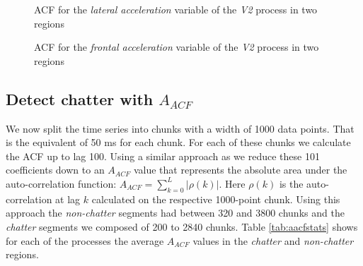 \documentclass[12 pt]{scrartcl}
\begin{document}
\begin{figure}[p]
  \caption{ACF for the \emph{lateral acceleration} variable of the \emph{V2} process in two regions}
  \label{fig:v2-lateral-acfs}
\end{figure}


\begin{figure}[p]
  \caption{ACF for the \emph{frontal acceleration} variable of the \emph{V2} process in two regions}
  \label{fig:v2-frontal-acfs}
\end{figure}

\subsection{Detect chatter with $A_{ACF}$}

We now split the time series into chunks with a width of 1000 data points. That is the equivalent of 50 ms for each chunk. For each of these chunks we calculate the ACF up to lag 100.
Using a similar approach as \citet{deistler2022time} we reduce these 101 coefficients down to an $A_{ACF}$ value that represents the absolute area under the auto-correlation function: $A_{ACF} = \sum^{L}_{k=0}{|\rho(k)|}$.
Here $\rho(k)$ is the auto-correlation at lag $k$ calculated on the respective 1000-point chunk. Using this approach the \emph{non-chatter} segments had between 320 and 3800 chunks and the \emph{chatter} segments we composed of 200 to 2840 chunks. Table \ref{tab:aacfstats} shows for each of the processes the average $A_{ACF}$ values in the \emph{chatter} and \emph{non-chatter} regions.
\end{document}

